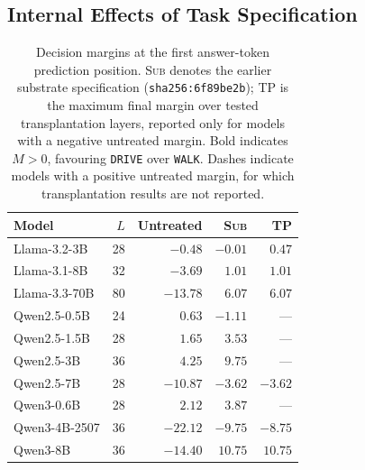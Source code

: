 \subsection{Internal Effects of Task Specification}
\label{sec:internal-results}

\begin{table}[t]
\centering
\caption{Decision margins at the first answer-token prediction position.
\textsc{Sub} denotes the earlier substrate specification
(\texttt{sha256:6f89be2b}); \textsc{TP} is the maximum final margin over tested
transplantation layers, reported only for models with a negative untreated margin.
Bold indicates $M>0$, favouring \texttt{DRIVE} over \texttt{WALK}. Dashes indicate
models with a positive untreated margin, for which transplantation results are not
reported.}
\label{tab:internal-margins}
\vspace{4pt}
\small
\begin{tabular*}{\columnwidth}{@{\extracolsep{\fill}}lrrrr@{}}
\toprule
Model & $L$ & Untreated & \textsc{Sub} & \textsc{TP} \\
\midrule
Llama-3.2-3B   & 28 & $-0.48$  & $-0.01$ & $\mathbf{0.47}$ \\
Llama-3.1-8B   & 32 & $-3.69$  & $\mathbf{1.01}$ & $\mathbf{1.01}$ \\
Llama-3.3-70B  & 80 & $-13.78$ & $\mathbf{6.07}$ & $\mathbf{6.07}$ \\
Qwen2.5-0.5B   & 24 & $\mathbf{0.63}$ & $-1.11$ & --- \\
Qwen2.5-1.5B   & 28 & $\mathbf{1.65}$ & $\mathbf{3.53}$ & --- \\
Qwen2.5-3B     & 36 & $\mathbf{4.25}$ & $\mathbf{9.75}$ & --- \\
Qwen2.5-7B     & 28 & $-10.87$ & $-3.62$ & $-3.62$ \\
Qwen3-0.6B     & 28 & $\mathbf{2.12}$ & $\mathbf{3.87}$ & --- \\
Qwen3-4B-2507  & 36 & $-22.12$ & $-9.75$ & $-8.75$ \\
Qwen3-8B       & 36 & $-14.40$ & $\mathbf{10.75}$ & $\mathbf{10.75}$ \\
\bottomrule
\end{tabular*}
\end{table}

